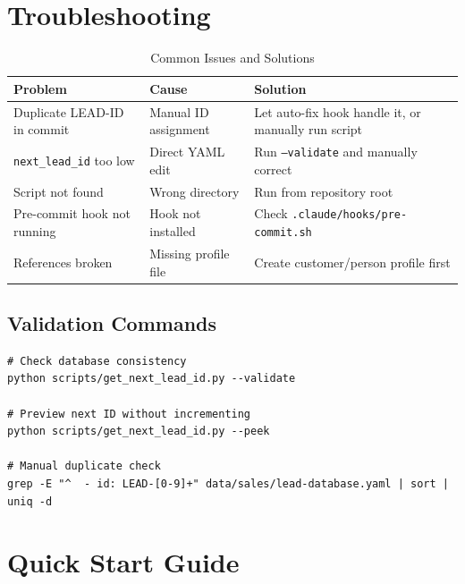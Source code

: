 \section{Troubleshooting}
\label{sec:bn-troubleshooting}

\begin{table}[htbp]
\centering
\caption{Common Issues and Solutions}
\label{tab:bn-troubleshooting}
\renewcommand{\arraystretch}{1.4}
\begin{tabular}{@{}p{4cm}p{4cm}p{5cm}@{}}
\toprule
\textbf{Problem} & \textbf{Cause} & \textbf{Solution} \\
\midrule
Duplicate LEAD-ID in commit & Manual ID assignment & Let auto-fix hook handle it, or manually run script \\

\texttt{next\_lead\_id} too low & Direct YAML edit & Run \texttt{--validate} and manually correct \\

Script not found & Wrong directory & Run from repository root \\

Pre-commit hook not running & Hook not installed & Check \texttt{.claude/hooks/pre-commit.sh} \\

References broken & Missing profile file & Create customer/person profile first \\
\bottomrule
\end{tabular}
\end{table}

\subsection{Validation Commands}

\begin{verbatim}
# Check database consistency
python scripts/get_next_lead_id.py --validate

# Preview next ID without incrementing
python scripts/get_next_lead_id.py --peek

# Manual duplicate check
grep -E "^  - id: LEAD-[0-9]+" data/sales/lead-database.yaml | sort | uniq -d
\end{verbatim}


\section{Quick Start Guide}
\label{sec:bn-quickstart}

